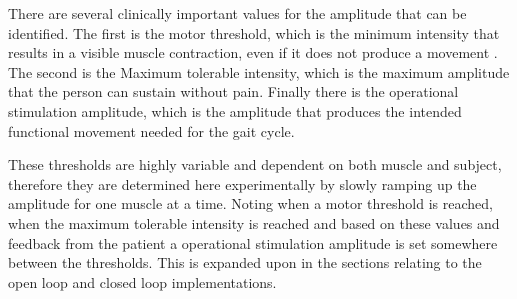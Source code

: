 There are several clinically important values for the amplitude that can be identified. The first is the motor threshold, which is the minimum intensity  that results in a visible muscle contraction, even if it does not produce a movement \cite{marquez-chin_functional_2020}. The second is the Maximum tolerable intensity, which is the maximum amplitude that the person can sustain without pain. Finally there is the operational stimulation amplitude, which is the amplitude that produces the intended functional movement needed for the gait cycle. 

These thresholds are highly variable and dependent on both muscle and subject, therefore they are determined here experimentally by slowly ramping up the amplitude for one muscle at a time. Noting when a motor threshold is reached, when the maximum tolerable intensity is reached and based on these values and feedback from the patient a operational stimulation amplitude is set somewhere between the thresholds. This is expanded upon in the sections relating to the open loop and closed loop implementations.


